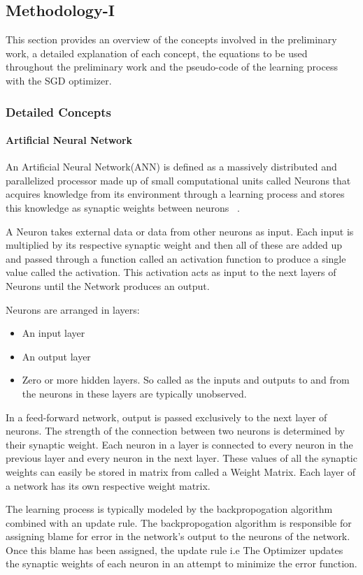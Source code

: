 \documentclass{article}
\begin{document}
\subsection{Methodology-I}
This section provides an overview of the concepts involved in the preliminary work, a detailed explanation of each concept, the equations to be used throughout the preliminary work and the pseudo-code of the learning process with the SGD optimizer. 
\subsubsection{Detailed Concepts}
\paragraph{Artificial Neural Network} An Artificial Neural Network(ANN) is defined as a massively distributed and parallelized processor made up of small computational units called Neurons that acquires knowledge from its environment through a learning process and stores this knowledge as synaptic weights between neurons ~\cite{ANNDefinition}. 

A Neuron takes external data or data from other neurons as input. Each input is multiplied by its respective synaptic weight and then all of these are added up and passed through a function called an activation function to produce a single value called the activation. This activation acts as input to the next layers of Neurons until the Network produces an output.

Neurons are arranged in layers:
\begin{itemize}
	\item An input layer
	\item An output layer
	\item Zero or more hidden layers. So called as the inputs and outputs to and from the neurons in these layers are typically unobserved.
\end{itemize}
In a feed-forward network, output is passed exclusively to the next layer of neurons. The strength of the connection between two neurons is determined by their synaptic weight. Each neuron in a layer is connected to every neuron in the previous layer and every neuron in the next layer. These values of all the synaptic weights can easily be stored in matrix from called a Weight Matrix. Each layer of a network has its own respective weight matrix. 

The learning process is typically modeled by the backpropogation algorithm combined with an update rule. The backpropogation algorithm is responsible for assigning blame for error in the network's output to the neurons of the network. Once this blame has been assigned, the update rule i.e The Optimizer updates the synaptic weights of each neuron in an attempt to minimize the error function.
\end{document}
